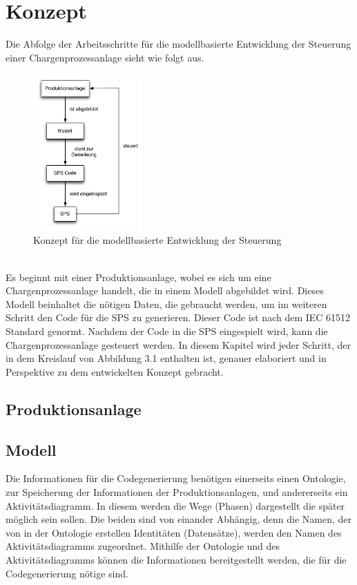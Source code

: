 
\chapter{Konzept} \label{chapter:architecture}
Die Abfolge der Arbeitsschritte für die modellbasierte Entwicklung der Steuerung einer Chargenprozessanlage sieht wie folgt aus.
\begin{figure}[h!]
		\centering
		\includegraphics[width=0.37\textwidth]{graphics/konzept/konzept_allblack.pdf}
		\caption{Konzept für die modellbasierte Entwicklung der Steuerung}
\end{figure} \\
Es beginnt mit einer Produktionsanlage, wobei es sich um eine Chargenprozessanlage handelt, die in einem Modell abgebildet wird. Dieses Modell beinhaltet die nötigen Daten, die gebraucht werden, um im weiteren Schritt den Code für die SPS zu generieren. Dieser Code ist nach dem IEC 61512 Standard genormt. Nachdem der Code in die SPS eingespielt wird, kann die Chargenprozessanlage gesteuert werden. 
In diesem Kapitel wird jeder Schritt, der in dem Kreislauf von Abbildung 3.1 enthalten ist, genauer elaboriert und in Perspektive zu dem entwickelten Konzept gebracht.
\section{Produktionsanlage}
\section{Modell}
Die Informationen für die Codegenerierung benötigen einerseits einen Ontologie, zur Speicherung der Informationen der Produktionsanlagen,  und andererseits ein Aktivitätsdiagramm. In diesem werden die Wege (Phasen) dargestellt die später möglich sein sollen.
Die beiden sind von einander Abhängig, denn die Namen, der von in der Ontologie erstellen Identitäten (Datensätze), werden den Namen des Aktivitätsdiagramms zugeordnet.
Mithilfe der Ontologie und des Aktivitätsdiagramms können die Informationen bereitgestellt werden, die für die Codegenerierung nötige sind.  

